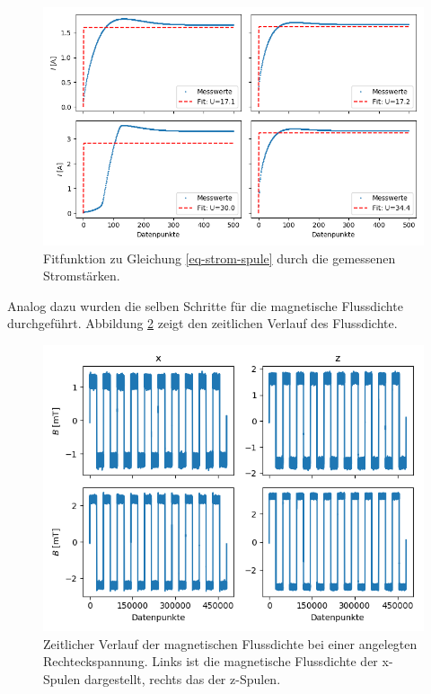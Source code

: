 \documentclass[page,pdftex,12pt,a4paper,twoside,openright]{scrbook}
\begin{document}
\begin{figure}[h]
\centering
\includegraphics[width=\textwidth]{img/strom_fit.png}
\caption{\label{fig-stromfit}
Fitfunktion zu Gleichung \ref{eq-strom-spule} durch die gemessenen Stromstärken.}
\end{figure}

Analog dazu wurden die selben Schritte für die magnetische Flussdichte durchgeführt. Abbildung \ref{fig-mag} zeigt den zeitlichen Verlauf des Flussdichte.

\begin{figure}[H]
\centering
\includegraphics[width=\textwidth]{img/mag.png}
\caption{\label{fig-mag}
Zeitlicher Verlauf der magnetischen Flussdichte bei einer angelegten Rechteckspannung. Links ist die magnetische Flussdichte der x-Spulen dargestellt, rechts das der z-Spulen.}
\end{figure}
\end{document}

